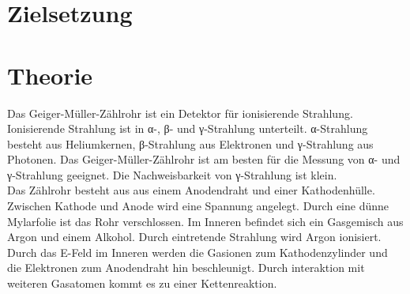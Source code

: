 \section{Zielsetzung}
\label{sec:Zielsetzung}

\section{Theorie}
\label{sec:Theorie}

Das Geiger-Müller-Zählrohr ist ein Detektor für ionisierende Strahlung. 
Ionisierende Strahlung ist in α-, β- und γ-Strahlung unterteilt. 
α-Strahlung besteht aus Heliumkernen, β-Strahlung aus Elektronen und γ-Strahlung aus Photonen.
Das Geiger-Müller-Zählrohr ist am besten für die Messung von 
α- und γ-Strahlung geeignet. Die Nachweisbarkeit von γ-Strahlung ist klein.
\\
Das Zählrohr besteht aus aus einem Anodendraht und einer Kathodenhülle.
Zwischen Kathode und Anode wird eine Spannung angelegt.
Durch eine dünne Mylarfolie ist das Rohr verschlossen.
Im Inneren befindet sich ein Gasgemisch aus Argon und einem Alkohol.
Durch eintretende Strahlung wird Argon ionisiert. 
Durch das E-Feld im Inneren werden die Gasionen zum Kathodenzylinder und die Elektronen zum Anodendraht hin beschleunigt.
Durch interaktion mit weiteren Gasatomen kommt es zu einer Kettenreaktion.